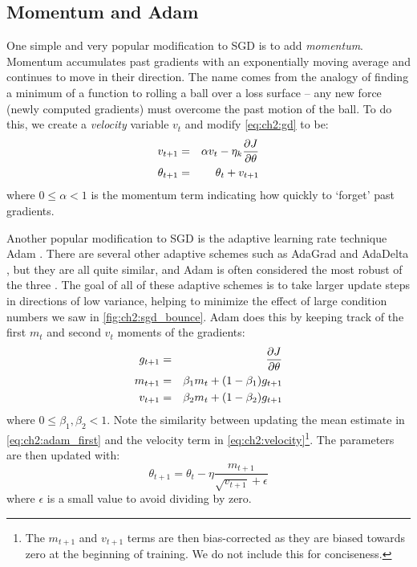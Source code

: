 \subsection{Momentum and Adam}
One simple and very popular modification to SGD is to add \emph{momentum}.
Momentum accumulates past gradients with an exponentially moving average and
continues to move in their direction. The name comes from the analogy of finding
a minimum of a function to rolling a ball over a loss surface --
any new force (newly computed gradients) must overcome the past motion of the
ball. To do this, we create a \emph{velocity} variable $v_{t}$ and modify
\eqref{eq:ch2:gd} to be:
\begin{eqnarray}
  v_{t+1} &=& \alpha v_t - \eta_k\frac{\partial J}{\partial \theta} \label{eq:ch2:velocity}\\
  \theta_{t+1} &=& \theta_t + v_{t+1} \\
\end{eqnarray}
where $0\leq\alpha<1$ is the momentum term indicating how quickly to `forget'
past gradients.

Another popular modification to SGD is the adaptive learning rate technique Adam
\cite{kingma_adam:_2014}. There are several other adaptive schemes such as
AdaGrad \cite{duchi_adaptive} and AdaDelta \cite{zeiler_adadelta:_2012}, but
they are all quite similar, and Adam is often considered the most robust of the
three \cite{goodfellow_deep_2016}. The goal of all of these adaptive schemes is
to take larger update steps in directions of low variance, helping to minimize
the effect of large condition numbers we saw in \autoref{fig:ch2:sgd_bounce}.
Adam does this by keeping track of the first $m_t$ and second $v_t$ moments of the
gradients:
\begin{eqnarray}
  g_{t+1} &=& \frac{\partial J}{\partial \theta} \\
  m_{t+1} &=& \beta_1 m_{t} + (1-\beta_1)g_{t+1} \label{eq:ch2:adam_first}\\
  v_{t+1} &=& \beta_2 m_{t} + (1-\beta_2)g_{t+1} \\
\end{eqnarray}
where $0 \leq \beta_1, \beta_2 < 1$. Note the similarity between updating the
mean estimate in \eqref{eq:ch2:adam_first} and the velocity term in
\eqref{eq:ch2:velocity}\footnote{The $m_{t+1}$ and $v_{t+1}$ terms are then
bias-corrected as they are biased towards zero at the beginning of training. We
do not include this for conciseness.}. The parameters are then updated with:
\begin{equation}
  \theta_{t+1} = \theta_t - \eta \frac{m_{t+1}}{\sqrt{v_{t+1}} + \epsilon}
\end{equation}
where $\epsilon$ is a small value to avoid dividing by zero. 
